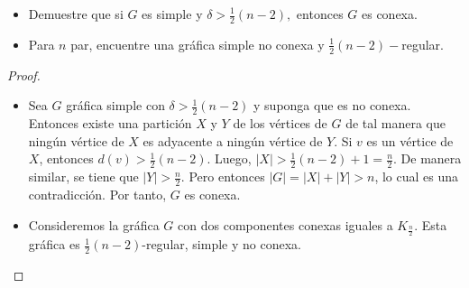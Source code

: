\documentclass[12pt]{article}
\newenvironment{problem}[2][Problema]{\begin{trivlist}
\item[\hskip \labelsep {\bfseries #1}\hskip \labelsep {\bfseries #2.}]}{\end{trivlist}}
\begin{document}
\begin{problem}{1.1.13} \text{ }
\begin{itemize}
    \item[a)] Demuestre que si $G$ es simple y $\delta > \frac{1}{2}(n-2),$ entonces $G$ es conexa. 
    \item[b)] Para $n$ par, encuentre una gráfica simple no conexa y $\frac{1}{2}(n-2)-$regular.
\end{itemize}
\end{problem}
\begin{proof}\text{ }
\begin{itemize}
    \item[a)] Sea $G$ gráfica simple con $\delta > \frac{1}{2}(n-2)$ y suponga que es no conexa. Entonces existe una partición  $X$ y $Y$ de los vértices de $G$ de tal manera que ningún vértice de $X$ es adyacente a ningún vértice de $Y$. Si $v$ es un vértice de $X$, entonces $d(v) > \frac{1}{2}(n-2)$. Luego, $\lvert X\rvert > \frac{1}{2}(n-2) + 1 = \frac{n}{2}.$ De manera similar, se tiene que $\lvert Y \rvert > \frac{n}{2}.$ Pero entonces $\lvert G \rvert  = \lvert X \rvert + \lvert Y \rvert > n$, lo cual es una contradicción. Por tanto, $G$ es conexa.
    \item[b)] Consideremos la gráfica $G$ con dos componentes conexas iguales a $K_{\frac{n}{2}}.$  Esta gráfica es $\frac{1}{2}(n-2)$-regular, simple y no conexa. 
\end{itemize}
\end{proof}
\end{document}
